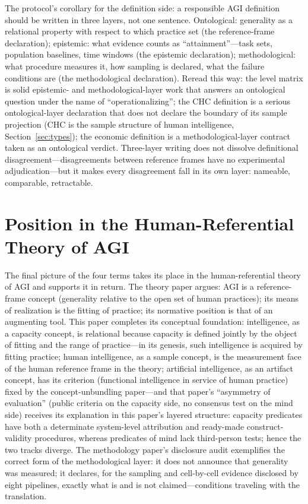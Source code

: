 \documentclass[10pt]{article}
\begin{document}
The protocol's corollary for the definition side: a responsible AGI definition should be written in three layers, not one sentence. Ontological: generality as a relational property with respect to which practice set (the reference-frame declaration)\cite{yu2026theory}; epistemic: what evidence counts as ``attainment''---task sets, population baselines, time windows (the epistemic declaration)\cite{morris2023levels,hendrycks2025definition}; methodological: what procedure measures it, how sampling is declared, what the failure conditions are (the methodological declaration)\cite{salaudeen2025measurement,yu2026methodology}. Reread this way: the level matrix is solid epistemic- and methodological-layer work that answers an ontological question under the name of ``operationalizing''\cite{morris2023levels}; the CHC definition is a serious ontological-layer declaration that does not declare the boundary of its sample projection (CHC is the sample structure of human intelligence, Section~\ref{sec:types}); the economic definition is a methodological-layer contract taken as an ontological verdict\cite{openai2018charter}. Three-layer writing does not dissolve definitional disagreement---disagreements between reference frames have no experimental adjudication---but it makes every disagreement fall in its own layer: nameable, comparable, retractable.

\section{Position in the Human-Referential Theory of AGI}\label{sec:program}

The final picture of the four terms takes its place in the human-referential theory of AGI and supports it in return. The theory paper argues: AGI is a reference-frame concept (generality relative to the open set of human practices); its means of realization is the fitting of practice; its normative position is that of an augmenting tool\cite{yu2026theory}. This paper completes its conceptual foundation: intelligence, as a capacity concept, is relational because capacity is defined jointly by the object of fitting and the range of practice---in its genesis, such intelligence is acquired by fitting practice\cite{yu2026theory}; human intelligence, as a sample concept, is the measurement face of the human reference frame in the theory; artificial intelligence, as an artifact concept, has its criterion (functional intelligence in service of human practice) fixed by the concept-unbundling paper\cite{yu2026twogoals}---and that paper's ``asymmetry of evaluation'' (public criteria on the capacity side, no consensus test on the mind side) receives its explanation in this paper's layered structure: capacity predicates have both a determinate system-level attribution and ready-made construct-validity procedures, whereas predicates of mind lack third-person tests; hence the two tracks diverge. The methodology paper's disclosure audit\cite{yu2026methodology} exemplifies the correct form of the methodological layer: it does not announce that generality was measured; it declares, for the sampling and cell-by-cell evidence disclosed by eight pipelines, exactly what is and is not claimed---conditions traveling with the translation.
\end{document}
